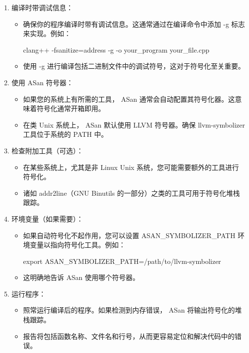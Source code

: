\begin{enumerate}
\item
编译时带调试信息：

\begin{itemize}
\item
确保你的程序编译时带有调试信息。这通常通过在编译命令中添加 -g 标志来实现。例如：

\begin{shell}
clang++ -fsanitize=address -g -o your_program your_file.cpp
\end{shell}

\item
使用 -g 进行编译包括二进制文件中的调试符号，这对于符号化至关重要。
\end{itemize}

\item
使用 ASan 符号器：

\begin{itemize}
\item
如果您的系统上有所需的工具， ASan 通常会自动配置其符号化器。这意味着符号化通常开箱即用。

\item
在类 Unix 系统上， ASan 默认使用 LLVM 符号器。确保 llvm-symbolizer 工具位于系统的 PATH 中。
\end{itemize}

\item
检查附加工具（可选）：

\begin{itemize}
\item
在某些系统上，尤其是非 Linux Unix 系统，您可能需要额外的工具进行符号化。

\item
诸如 addr2line（GNU Binutils 的一部分）之类的工具可用于符号化堆栈跟踪。
\end{itemize}

\item
环境变量（如果需要）：

\begin{itemize}
\item
如果自动符号化不起作用，您可以设置 ASAN\_SYMBOLIZER\_PATH 环境变量以指向符号化工具。例如：

\begin{shell}
export ASAN_SYMBOLIZER_PATH=/path/to/llvm-symbolizer
\end{shell}

\item
这明确地告诉 ASan 使用哪个符号器。
\end{itemize}

\item
运行程序：

\begin{itemize}
\item
照常运行编译后的程序。如果检测到内存错误， ASan 将输出符号化的堆栈跟踪。

\item
报告将包括函数名称、文件名和行号，从而更容易定位和解决代码中的错误。
\end{itemize}
\end{enumerate}

